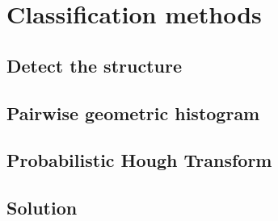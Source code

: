 \chapter{Classification methods }
\section{Detect the structure}
\section{Pairwise geometric histogram}
\section{Probabilistic Hough Transform}
\section{Solution}